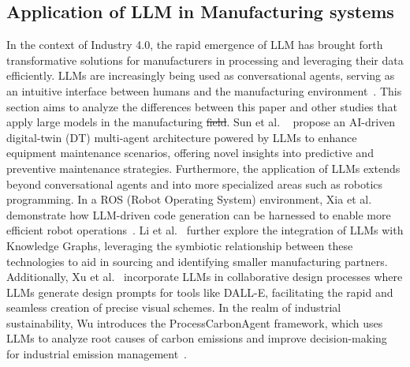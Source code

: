\documentclass[preprint,12pt]{elsarticle}
\providecommand{\DIFaddtex}[1]{{\protect\color{blue}\uwave{#1}}} %
\providecommand{\DIFdeltex}[1]{{\protect\color{red}\sout{#1}}}                      %
\providecommand{\DIFaddbegin}{} %
\providecommand{\DIFaddend}{} %
\providecommand{\DIFdelbegin}{} %
\providecommand{\DIFdelend}{} %
\providecommand{\DIFadd}[1]{\texorpdfstring{\DIFaddtex{#1}}{#1}} %
\providecommand{\DIFdel}[1]{\texorpdfstring{\DIFdeltex{#1}}{}} %
\newcommand{\DIFscaledelfig}{0.5}
\newlength{\DIFdelgraphicswidth} %
\newlength{\DIFdelgraphicsheight} %
\newcommand{\DIFaddincludegraphics}[2][]{{\color{blue}\fbox{\DIFOincludegraphics[#1]{#2}}}} %
\newcommand{\DIFdelincludegraphics}[2][]{%
\sbox{\DIFdelgraphicsbox}{\DIFOincludegraphics[#1]{#2}}%
\settoboxwidth{\DIFdelgraphicswidth}{\DIFdelgraphicsbox} %
\settoboxtotalheight{\DIFdelgraphicsheight}{\DIFdelgraphicsbox} %
\scalebox{\DIFscaledelfig}{%
\parbox[b]{\DIFdelgraphicswidth}{\usebox{\DIFdelgraphicsbox}\\[-\baselineskip] \rule{\DIFdelgraphicswidth}{0em}}\llap{\resizebox{\DIFdelgraphicswidth}{\DIFdelgraphicsheight}{%
\setlength{\unitlength}{\DIFdelgraphicswidth}%
\begin{picture}(1,1)%
\thicklines\linethickness{2pt} %
{\color[rgb]{1,0,0}\put(0,0){\framebox(1,1){}}}%
{\color[rgb]{1,0,0}\put(0,0){\line( 1,1){1}}}%
{\color[rgb]{1,0,0}\put(0,1){\line(1,-1){1}}}%
\end{picture}%
}\hspace*{3pt}}} %
} %
\DeclareRobustCommand{\DIFaddbegin}{\DIFOaddbegin \let\includegraphics\DIFaddincludegraphics} %
\DeclareRobustCommand{\DIFaddend}{\DIFOaddend \let\includegraphics\DIFOincludegraphics} %
\DeclareRobustCommand{\DIFdelbegin}{\DIFOdelbegin \let\includegraphics\DIFdelincludegraphics} %
\DeclareRobustCommand{\DIFdelend}{\DIFOaddend \let\includegraphics\DIFOincludegraphics} %
\begin{document}
\subsection{Application of LLM in Manufacturing systems}
In the context of Industry 4.0, the rapid emergence of LLM has brought forth transformative solutions for manufacturers in processing and leveraging their data efficiently. 
LLMs are increasingly being used as conversational agents, serving as an intuitive interface between humans and the manufacturing environment~\cite{colabianchi2023human}. 
This section aims to analyze the differences between this paper and other studies that apply large models in the manufacturing \DIFdelbegin \DIFdel{field}\DIFdelend \DIFaddbegin \DIFadd{scenarios}\DIFaddend .
Sun et al. ~\cite{sun2024empowering} propose an AI-driven digital-twin (DT) multi-agent architecture powered by LLMs to enhance equipment maintenance scenarios, offering novel insights into predictive and preventive maintenance strategies. 
Furthermore, the application of LLMs extends beyond conversational agents and into more specialized areas such as robotics programming. In a ROS (Robot Operating System) environment, Xia et al. demonstrate how LLM-driven code generation can be harnessed to enable more efficient robot operations~\cite{XIA2024102728}. 
Li et al.~\cite{li2024building} further explore the integration of LLMs with Knowledge Graphs, leveraging the symbiotic relationship between these technologies to aid in sourcing and identifying smaller manufacturing partners. 
Additionally, Xu et al.~\cite{xu2024llm} incorporate LLMs in collaborative design processes where LLMs generate design prompts for tools like DALL-E, facilitating the rapid and seamless creation of precise visual schemes.
In the realm of industrial sustainability, Wu introduces the ProcessCarbonAgent framework, which uses LLMs to analyze root causes of carbon emissions and improve decision-making for industrial emission management~\cite{wu2024processcarbonagent}. 
\end{document}
